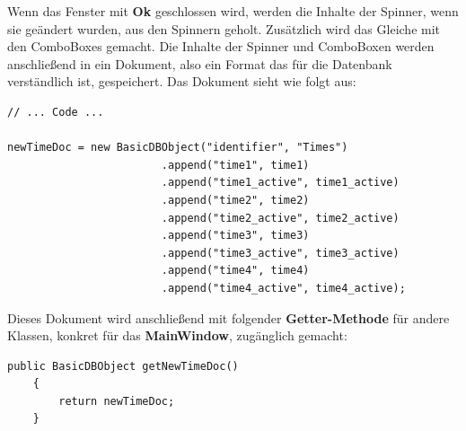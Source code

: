 Wenn das Fenster mit \textbf{Ok} geschlossen wird, werden die Inhalte der Spinner, wenn sie geändert wurden, aus den Spinnern geholt. Zusätzlich wird das Gleiche mit den ComboBoxes gemacht. Die Inhalte der Spinner und ComboBoxen werden anschließend in ein Dokument, also ein Format das für die Datenbank verständlich ist, gespeichert. Das Dokument sieht wie folgt aus:

\newpage

\begin{lstlisting}[style=Javastyle, caption=Zeitendokument]
// ... Code ...

newTimeDoc = new BasicDBObject("identifier", "Times")
                        .append("time1", time1)
                        .append("time1_active", time1_active)
                        .append("time2", time2)
                        .append("time2_active", time2_active)
                        .append("time3", time3)
                        .append("time3_active", time3_active)
                        .append("time4", time4)
                        .append("time4_active", time4_active);
\end{lstlisting}
Dieses Dokument wird anschließend mit folgender \textbf{Getter-Methode} für andere Klassen, konkret für das \textbf{MainWindow}, zugänglich gemacht:
\begin{lstlisting}[style=Javastyle, caption=Zeitendokument Getter-Methode]
public BasicDBObject getNewTimeDoc()
    {
        return newTimeDoc;
    }
\end{lstlisting}

\newpage

